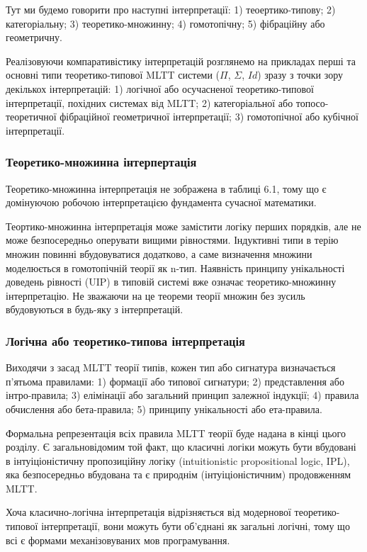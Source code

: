 Тут ми будемо говорити про наступні інтерпретації:
1) теоертико-типову;
2) категоріальну;
3) теоретико-множинну;
4) гомотопічну;
5) фібраційну або геометричну.

Реалізовуючи компаративістику інтерпретацій розглянемо на прикладах
перші та основні типи теоретико-типової MLTT системи ($\Pi$, $\Sigma$, $Id$) зразу
з точки зору декількох інтерпретацій:
1) логічної або осучасненої теоретико-типової інтерпретації, похідних системах від MLTT;
2) категоріальної або топосо-теоретичної фібраційної геометричної інтерпретації;
3) гомотопічної або кубічної інтерпретації.

\subsubsection{Теоретико-множинна інтерпертація}
Теоретико-множинна інтерпретація не зображена в таблиці 6.1, тому
що є домінуючою робочою інтерпретацією фундамента сучасної математики.

Теортико-множинна інтерпретація може замістити логіку перших порядків, але не може
безпосередньо оперувати вищими рівностями. Індуктивні типи в терію множин повинні
вбудовуватися додатково, а саме визначення множини моделюється в гомотопічній
теорії як n-тип. Наявність принципу унікальності
доведень рівності (UIP) в типовій системі вже означає теоретико-множинну інтерпретацію.
Не зважаючи на це теореми теорії множин без зусиль вбудовуються
в будь-яку з інтерпретацій.

\subsubsection{Логічна або теоретико-типова інтерпретація}
Виходячи з засад MLTT теорії типів, кожен тип або сигнатура визначається
п'ятьома правилами:
1) формації або типової сигнатури;
2) представлення або інтро-правила;
3) елімінації або загальний принцип залежної індукції;
4) правила обчислення або бета-правила;
5) принципу унікальності або ета-правила.

Формальна репрезентація всіх правила MLTT теорії буде надана в кінці цього розділу.
Є загальновідомим той факт, що класичні логіки можуть бути вбудовані в інтуіціоністичну
пропозиційну логіку (intuitionistic propositional logic, IPL), яка безпосередньо
вбудована та є природнім (інтуіціоністичним) продовженням MLTT.

Хоча класично-логічна інтерпретація відрізняється від модернової теоретико-типової
інтерпретації, вони можуть бути об'єднані як загальні логічні, тому що всі є
формами механізовуваних мов програмування.

